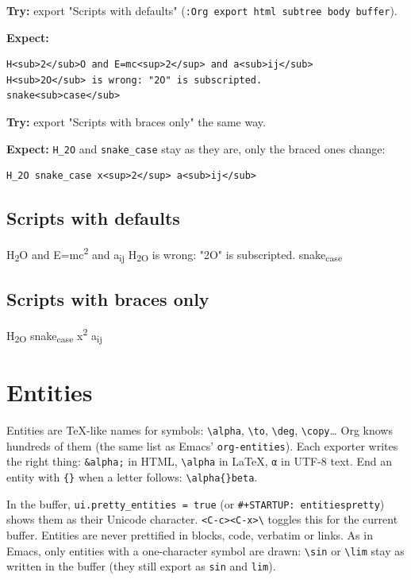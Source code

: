 \textbf{Try:} export "Scripts with defaults" (\texttt{:Org export html subtree body
buffer}).

\textbf{Expect:}
\begin{verbatim}
H<sub>2</sub>O and E=mc<sup>2</sup> and a<sub>ij</sub>
H<sub>2O</sub> is wrong: "2O" is subscripted.
snake<sub>case</sub>
\end{verbatim}

\textbf{Try:} export "Scripts with braces only" the same way.

\textbf{Expect:} \texttt{H\_2O} and \texttt{snake\_case} stay as they are, only the braced ones
change:
\begin{verbatim}
H_2O snake_case x<sup>2</sup> a<sub>ij</sub>
\end{verbatim}
\subsection{Scripts with defaults}
\label{sec:orgbdb4163}
H\textsubscript{2}O and E=mc\textsuperscript{2} and a\textsubscript{ij}
H\textsubscript{2O} is wrong: "2O" is subscripted.
snake\textsubscript{case}
\subsection{Scripts with braces only}
\label{sec:org6852f3b}
H\textsubscript{2O} snake\textsubscript{case} x\textsuperscript{2} a\textsubscript{ij}
\section{Entities}
\label{sec:org3d780a4}
Entities are \TeX{}-like names for symbols: \texttt{\textbackslash{}alpha}, \texttt{\textbackslash{}to}, \texttt{\textbackslash{}deg},
\texttt{\textbackslash{}copy}\ldots{} Org knows hundreds of them (the same list as Emacs'
\texttt{org-entities}). Each exporter writes the right thing: \texttt{\&alpha;} in HTML,
\texttt{\textbackslash{}alpha} in \LaTeX{}, \texttt{α} in UTF-8 text. End an entity with \texttt{\{\}} when a letter
follows: \texttt{\textbackslash{}alpha\{\}beta}.

In the buffer, \texttt{ui.pretty\_entities = true} (or \texttt{\#+STARTUP: entitiespretty})
shows them as their Unicode character. \texttt{<C-c><C-x>\textbackslash{}} toggles this for the
current buffer. Entities are never prettified in blocks, code, verbatim or
links. As in Emacs, only entities with a one-character symbol are drawn:
\texttt{\textbackslash{}sin} or \texttt{\textbackslash{}lim} stay as written in the buffer (they still export as
\texttt{sin} and \texttt{lim}).

